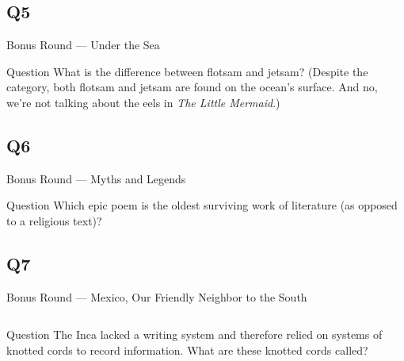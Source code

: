 \documentclass[11pt]{beamer}
\begin{document}
\subsection*{Q5}
\begin{frame}[t]{Bonus Round --- Under the Sea}
\vspace{-0.5em}
\begin{block}{Question}
What is the difference between flotsam and jetsam? (Despite the category, both flotsam and jetsam are found on the ocean's surface. And no, we're not talking about the eels in \emph{The Little Mermaid}.)
\end{block}
\end{frame}
\subsection*{Q6}
\begin{frame}[t]{Bonus Round --- Myths and Legends}
\vspace{-0.5em}
\begin{block}{Question}
Which epic poem is the oldest surviving work of literature (as opposed to a religious text)?
\end{block}
\end{frame}
\subsection*{Q7}
\begin{frame}[t]{Bonus Round --- Mexico, Our Friendly Neighbor to the South}
\vspace{-0.5em}
\begin{columns}[T,totalwidth=\linewidth]
\begin{column}{0.32\linewidth}
\begin{block}{Question}
The Inca lacked a writing system and therefore relied on systems of knotted cords to record information. What are these knotted cords called?
\end{block}
\end{column}
\begin{column}{0.65\linewidth}
\begin{center}
\texttt{[image: \{Images/quipu]}.jpg}
\end{center}
\end{column}
\end{columns}
\end{frame}
\end{document}

